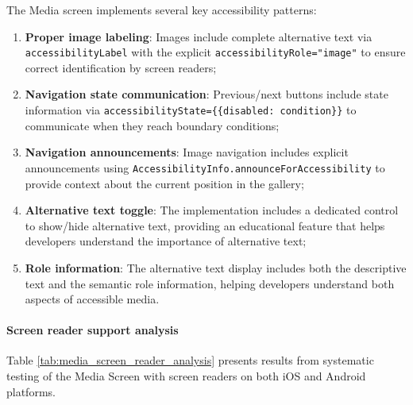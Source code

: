 The Media screen implements several key accessibility patterns:

\begin{enumerate}
    \item \textbf{Proper image labeling}: Images include complete alternative text via \texttt{accessibilityLabel} with the explicit \texttt{accessibilityRole="image"} to ensure correct identification by screen readers;
    
    \item \textbf{Navigation state communication}: Previous/next buttons include state information via \texttt{accessibilityState=\{\{disabled: condition\}\}} to communicate when they reach boundary conditions;
    
    \item \textbf{Navigation announcements}: Image navigation includes explicit announcements using \texttt{AccessibilityInfo.announceForAccessibility} to provide context about the current position in the gallery;
    
    \item \textbf{Alternative text toggle}: The implementation includes a dedicated control to show/hide alternative text, providing an educational feature that helps developers understand the importance of alternative text;
    
    \item \textbf{Role information}: The alternative text display includes both the descriptive text and the semantic role information, helping developers understand both aspects of accessible media.
\end{enumerate}

\paragraph{Screen reader support analysis}

Table \ref{tab:media_screen_reader_analysis} presents results from systematic testing of the Media Screen with screen readers on both iOS and Android platforms.

